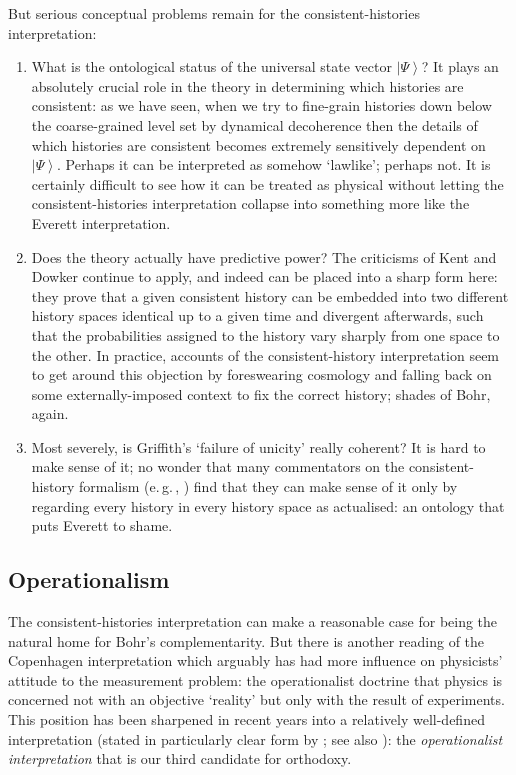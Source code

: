 \documentclass[12pt]{article}
\newcommand{\egc}{\mbox{e.\,g.\,}}
\newcommand{\ket}[1]{\ensuremath{\left|  #1 \right\rangle}}
\begin{document}
But serious conceptual problems remain for the consistent-histories interpretation:
\begin{enumerate}
\item What is the ontological status of the universal state vector \ket{\Psi}? It plays an absolutely crucial role in the theory in determining which histories are consistent: as we have seen, when we try to fine-grain histories down below the coarse-grained level set by dynamical decoherence then the details of which histories are consistent becomes extremely sensitively dependent on \ket{\Psi}. Perhaps it can be interpreted as somehow `lawlike'; perhaps not. It is certainly difficult to see how it can be treated as physical without letting the consistent-histories interpretation collapse into something more like the Everett interpretation.
\item Does the theory actually have predictive power? The criticisms of Kent and Dowker continue to apply, and indeed can be placed into a sharp form here: they prove that a given consistent history can be embedded into two different history spaces  identical up to a given time and divergent afterwards, such that the probabilities assigned to the history vary sharply from one space to the other. In practice, accounts of the consistent-history interpretation seem to get around this objection by foreswearing cosmology and falling back on some externally-imposed context to fix the correct history; shades of Bohr, again.
\item Most severely, is Griffith's `failure of unicity' really coherent? It is hard to make sense of it; no wonder that many commentators on the consistent-history formalism (\egc, ) find that they can make sense of it only by regarding every history in every history space as actualised: an ontology that puts Everett to shame. 
\end{enumerate}


\subsection{Operationalism}\label{DMWWoperationalist}

The consistent-histories interpretation can make a reasonable case for being the natural home for Bohr's complementarity. But there is another reading of the Copenhagen interpretation which arguably has had more influence on physicists' attitude to the measurement problem: the operationalist doctrine that physics is concerned not with an objective `reality' but only with the result of experiments. This position has been sharpened in recent years into a relatively well-defined interpretation (stated in particularly clear form by ; see also ): the \emph{operationalist interpretation} that is our third candidate for orthodoxy.
\end{document}
